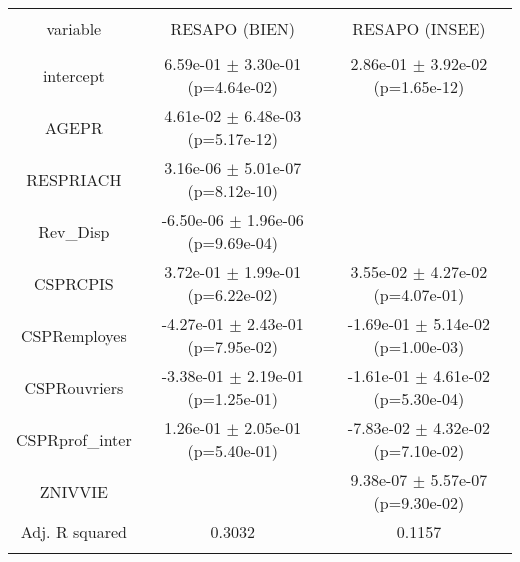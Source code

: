 \documentclass{article}
\begin{document}
\begin{table*}[!htbp] \centering 
  \caption{} 
  \label{} 
\begin{tabular}{@{\extracolsep{5pt}} ccc} 
\\[-1.8ex]\hline 
\hline \\[-1.8ex] 
variable & RESAPO (BIEN) & RESAPO (INSEE) \\ 
\hline \\[-1.8ex] 
intercept &  6.59e-01 $\pm$ 3.30e-01 (p=4.64e-02) &  2.86e-01 $\pm$ 3.92e-02 (p=1.65e-12) \\ 
AGEPR &  4.61e-02 $\pm$ 6.48e-03 (p=5.17e-12) &  \\ 
RESPRIACH &  3.16e-06 $\pm$ 5.01e-07 (p=8.12e-10) &  \\ 
Rev\_Disp & -6.50e-06 $\pm$ 1.96e-06 (p=9.69e-04) &  \\ 
CSPRCPIS &  3.72e-01 $\pm$ 1.99e-01 (p=6.22e-02) &  3.55e-02 $\pm$ 4.27e-02 (p=4.07e-01) \\ 
CSPRemployes & -4.27e-01 $\pm$ 2.43e-01 (p=7.95e-02) & -1.69e-01 $\pm$ 5.14e-02 (p=1.00e-03) \\ 
CSPRouvriers & -3.38e-01 $\pm$ 2.19e-01 (p=1.25e-01) & -1.61e-01 $\pm$ 4.61e-02 (p=5.30e-04) \\ 
CSPRprof\_inter &  1.26e-01 $\pm$ 2.05e-01 (p=5.40e-01) & -7.83e-02 $\pm$ 4.32e-02 (p=7.10e-02) \\ 
ZNIVVIE &  &  9.38e-07 $\pm$ 5.57e-07 (p=9.30e-02) \\ 
\hline Adj. R squared & 0.3032 & 0.1157 \\ 
\hline \\[-1.8ex] 
\end{tabular} 
\end{table*} 
\end{document}
